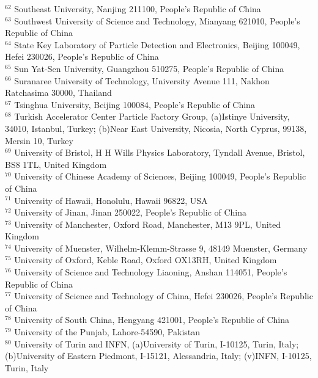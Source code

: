 \documentclass[aps,amsmath,amssymb,reprint]{revtex4-2}
\begin{document}
\begin{widetext}
\begin{center}
{$^{62}$ Southeast University, Nanjing 211100, People's Republic of China\\
$^{63}$ Southwest University of Science and Technology, Mianyang 621010, People's Republic of China\\
$^{64}$ State Key Laboratory of Particle Detection and Electronics, Beijing 100049, Hefei 230026, People's Republic of China\\
$^{65}$ Sun Yat-Sen University, Guangzhou 510275, People's Republic of China\\
$^{66}$ Suranaree University of Technology, University Avenue 111, Nakhon Ratchasima 30000, Thailand\\
$^{67}$ Tsinghua University, Beijing 100084, People's Republic of China\\
$^{68}$ Turkish Accelerator Center Particle Factory Group, (a)Istinye University, 34010, Istanbul, Turkey; (b)Near East University, Nicosia, North Cyprus, 99138, Mersin 10, Turkey\\
$^{69}$ University of Bristol, H H Wills Physics Laboratory, Tyndall Avenue, Bristol, BS8 1TL, United Kingdom\\
$^{70}$ University of Chinese Academy of Sciences, Beijing 100049, People's Republic of China\\
$^{71}$ University of Hawaii, Honolulu, Hawaii 96822, USA\\
$^{72}$ University of Jinan, Jinan 250022, People's Republic of China\\
$^{73}$ University of Manchester, Oxford Road, Manchester, M13 9PL, United Kingdom\\
$^{74}$ University of Muenster, Wilhelm-Klemm-Strasse 9, 48149 Muenster, Germany\\
$^{75}$ University of Oxford, Keble Road, Oxford OX13RH, United Kingdom\\
$^{76}$ University of Science and Technology Liaoning, Anshan 114051, People's Republic of China\\
$^{77}$ University of Science and Technology of China, Hefei 230026, People's Republic of China\\
$^{78}$ University of South China, Hengyang 421001, People's Republic of China\\
$^{79}$ University of the Punjab, Lahore-54590, Pakistan\\
$^{80}$ University of Turin and INFN, (a)University of Turin, I-10125, Turin, Italy; (b)University of Eastern Piedmont, I-15121, Alessandria, Italy; (v)INFN, I-10125, Turin, Italy\\
}
\end{center}
\end{widetext}
\end{document}
